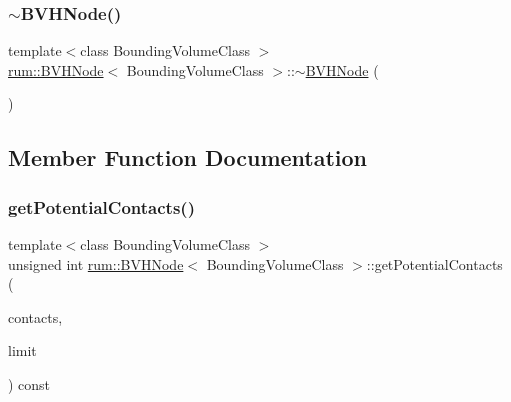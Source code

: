 \subsubsection{\texorpdfstring{$\sim$\+B\+V\+H\+Node()}{~BVHNode()}}
{\footnotesize\ttfamily template$<$class Bounding\+Volume\+Class $>$ \\
\mbox{\hyperlink{classrum_1_1_b_v_h_node}{rum\+::\+B\+V\+H\+Node}}$<$ Bounding\+Volume\+Class $>$\+::$\sim$\mbox{\hyperlink{classrum_1_1_b_v_h_node}{B\+V\+H\+Node}} (\begin{DoxyParamCaption}{ }\end{DoxyParamCaption})}



\subsection{Member Function Documentation}
\mbox{\label{classrum_1_1_b_v_h_node_aee31330a43145dd2ee59a245cf4481f1}} 
\subsubsection{\texorpdfstring{get\+Potential\+Contacts()}{getPotentialContacts()}}
{\footnotesize\ttfamily template$<$class Bounding\+Volume\+Class $>$ \\
unsigned int \mbox{\hyperlink{classrum_1_1_b_v_h_node}{rum\+::\+B\+V\+H\+Node}}$<$ Bounding\+Volume\+Class $>$\+::get\+Potential\+Contacts (\begin{DoxyParamCaption}\item[{\mbox{\hyperlink{structrum_1_1_potential_contacts}{Potential\+Contacts}} $\ast$}]{contacts,  }\item[{unsigned int}]{limit }\end{DoxyParamCaption}) const}

\mbox{\label{classrum_1_1_b_v_h_node_a2a840c54d0bbf56b62423a844b4e170d}} 
